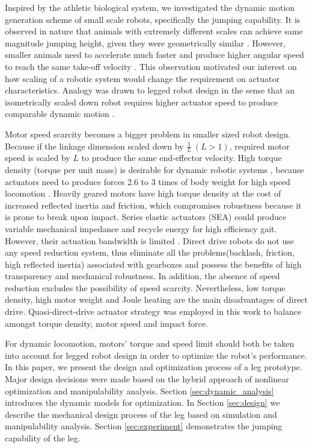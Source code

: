 	 Inspired by the athletic biological system, we investigated the dynamic motion generation scheme of small scale robots, specifically the jumping capability. It is observed in nature that animals with extremely different scales can achieve same magnitude jumping height, given they were geometrically similar \cite{alexander247mcn}. However, smaller animals need to accelerate much faster and produce higher angular speed to reach the same take-off velocity \cite{schmidt1984scaling}. This observation motivated our interest on how scaling of a robotic system would change the requirement on actuator characteristics. Analogy was drawn to legged robot design in the sense that an isometrically scaled down robot requires higher actuator speed to produce comparable dynamic motion \cite{scholz2006scaling}.

	Motor speed scarcity becomes a bigger problem in smaller sized robot design. Because if the linkage dimension scaled down by $\frac{1}{L}~(L>1)$, required motor speed is scaled by $L$ to produce the same end-effector velocity. High torque density (torque per unit mass) is desirable for dynamic robotic systems \cite{Seok2012}, because actuators need to produce forces 2.6 to 3 times of body weight for high speed locomotion \cite{Walter2007}\cite{Bobbert1992}. Heavily geared motors have high torque density at the cost of increased reflected inertia and friction\cite{Sakagami2002}, which compromises robustness because it is prone to break upon impact. Series elastic actuators (SEA) could produce variable mechanical impedance and recycle energy for high efficiency gait. However, their actuation bandwidth is limited \cite{robinson1999series}. Direct drive robots \cite{Asada:1987:DRT:27675} do not use any speed reduction system, thus eliminate all the problems(backlash, friction, high reflected inertia) associated with gearboxes and possess the benefits of high transparency \cite{Carignan2000} and mechanical robustness. In addition, the absence of speed reduction excludes the possibility of speed scarcity. Nevertheless, low torque density, high motor weight and Joule heating are the main disadvantages of direct drive. Quasi-direct-drive actuator strategy \cite{kalouche2016design} was employed in this work to balance amongst torque density, motor speed and impact force. 

For dynamic locomotion, motors' torque and speed limit should both be taken into account for legged robot design in order to optimize the robot's performance. In this paper, we present the design and optimization process of a leg prototype. Major design decisions were made based on the hybrid approach of nonlinear optimization and manipulability analysis. Section \ref{sec:dynamic_analysis} introduces the dynamic models for optimization. In Section \ref{sec:design} we describe the mechanical design process of the leg based on simulation and manipulability analysis. Section \ref{sec:experiment} demonstrates the jumping capability of the leg.

